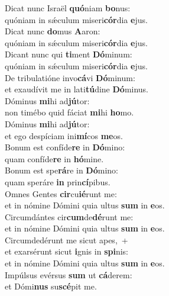 \evenverse Dicat nunc Israël \textbf{quó}niam \textbf{bo}nus:~\*\\
\evenverse quóniam in sǽculum miseri\textbf{cór}dia \textbf{e}jus.\\
\oddverse Dicat nunc \textbf{do}mus \textbf{A}aron:~\*\\
\oddverse quóniam in sǽculum miseri\textbf{cór}dia \textbf{e}jus.\\
\evenverse Dicant nunc qui \textbf{ti}ment \textbf{Dó}minum:~\*\\
\evenverse quóniam in sǽculum miseri\textbf{cór}dia \textbf{e}jus.\\
\oddverse De tribulatióne invo\textbf{cá}vi \textbf{Dó}minum:~\*\\
\oddverse et exaudívit me in lati\textbf{tú}dine \textbf{Dó}minus.\\
\evenverse Dóminus \textbf{mi}hi ad\textbf{jú}tor:~\*\\
\evenverse non timébo quid fáciat \textbf{mi}hi \textbf{ho}mo.\\
\oddverse Dóminus \textbf{mi}hi ad\textbf{jú}tor:~\*\\
\oddverse et ego despíciam ini\textbf{mí}cos \textbf{me}os.\\
\evenverse Bonum est confíde\textbf{re} in \textbf{Dó}mino:~\*\\
\evenverse quam confíde\textbf{re} in \textbf{hó}mine.\\
\oddverse Bonum est spe\textbf{rá}re in \textbf{Dó}mino:~\*\\
\oddverse quam speráre \textbf{in} prin\textbf{cí}pibus.\\
\evenverse Omnes Gentes \textbf{cir}cu\textbf{ié}runt me:~\*\\
\evenverse et in nómine Dómini quia ultus \textbf{sum} in \textbf{e}os.\\
\oddverse Circumdántes cir\textbf{cum}de\textbf{dé}runt me:~\*\\
\oddverse et in nómine Dómini quia ultus \textbf{sum} in \textbf{e}os.\\
\evenverse Circumdedérunt me sicut apes,~+\\
\evenverse  et exarsérunt sicut \textbf{i}gnis in \textbf{spi}nis:~\*\\
\evenverse et in nómine Dómini quia ultus \textbf{sum} in \textbf{e}os.\\
\oddverse Impúlsus evérsus \textbf{sum} ut \textbf{cá}derem:~\*\\
\oddverse et Dómi\textbf{nus} su\textbf{scé}pit me.\\
